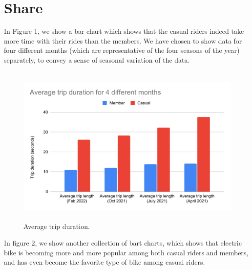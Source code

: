 \documentclass[11pt,twoside]{article}
\theoremstyle{plain}
\theoremstyle{definition}
\theoremstyle{remark}
\begin{document}
\section{Share}
In Figure 1, we show a bar chart which shows that the casual riders indeed take more time with their rides than the members. We have chosen to show data for four different months (which are representative of the four seasons of the year) separately, to convey a sense of seasonal variation of the data.
\begin{center}
\begin{figure}
\includegraphics[width=12cm, height=8cm]{Average trip duration.pdf}
\caption{Average trip duration.}
\end{figure}
\end{center}
In figure 2, we show another collection of bart charts, which shows that electric bike is becoming more and more popular among both casual riders and members, and has even become the favorite type of bike among casual riders.
\end{document}
